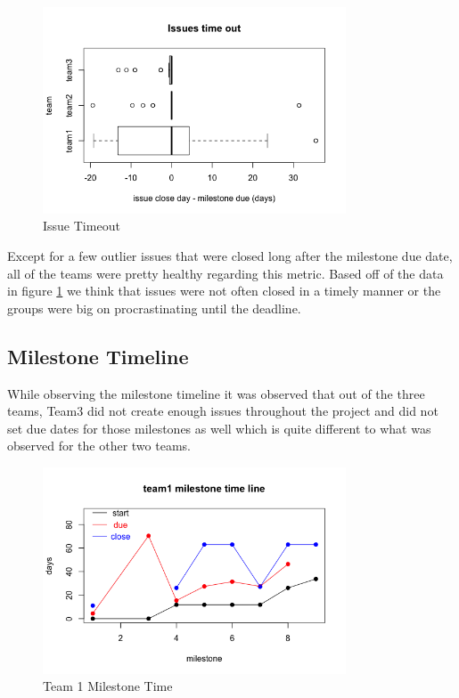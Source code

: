 \documentclass[conference]{IEEEtran}
\begin{document}
\begin{figure}[H]
    \centering
    \includegraphics[width=9cm]{../AprilProject/pic/issues_timeout.png}
    \caption{Issue Timeout}
    \label{issue_timeout}
\end{figure}


Except for a few outlier issues that were closed long after the milestone due date, all of the teams were pretty healthy regarding this metric. Based off of the data in figure \ref{issue_timeout} we think that issues were not often closed in a timely manner or the groups were big on procrastinating until the deadline. 


\subsection{Milestone Timeline}

While observing the milestone timeline it was observed that out of the three teams, Team3 did not create enough issues throughout the project and did not set due dates for those milestones as well which is quite different to what was observed for the other two teams. 


\begin{figure}[H]
    \centering
    \includegraphics[width=9cm]{../AprilProject/pic/team1_milestone_time.png}
    \caption{Team 1 Milestone Time}
    \label{team1_milestone_time}
\end{figure}
\end{document}

